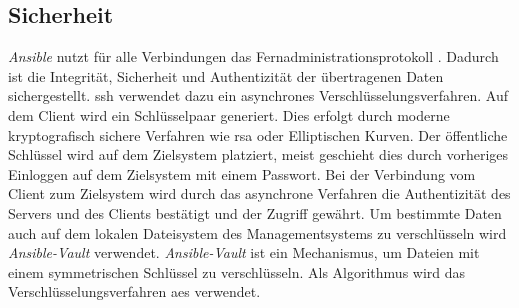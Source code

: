 \documentclass[titlepage]{report}
\begin{document}
\subsection{Sicherheit}
\emph{Ansible} nutzt für alle Verbindungen das
Fernadministrationsprotokoll . Dadurch ist die Integrität,
Sicherheit und Authentizität der übertragenen Daten sichergestellt.
\gls{ssh} verwendet dazu ein asynchrones Verschlüsselungsverfahren. Auf
dem Client wird ein Schlüsselpaar generiert. Dies erfolgt durch moderne
kryptografisch sichere Verfahren wie \gls{rsa} oder Elliptischen Kurven.
Der öffentliche Schlüssel wird auf dem Zielsystem platziert, meist
geschieht dies durch vorheriges Einloggen auf dem Zielsystem mit einem
Passwort. Bei der Verbindung vom Client zum Zielsystem wird durch das
asynchrone Verfahren die Authentizität des Servers und des Clients
bestätigt und der Zugriff gewährt. Um bestimmte Daten auch auf dem
lokalen Dateisystem des Managementsystems zu verschlüsseln wird
\emph{Ansible\hyp{}Vault} verwendet. \emph{Ansible\hyp{}Vault} ist ein
Mechanismus, um Dateien mit einem symmetrischen Schlüssel zu
verschlüsseln. Als Algorithmus wird das Verschlüsselungsverfahren
\gls{aes} verwendet\cite{ANSIBLEVAULT}.
\end{document}
